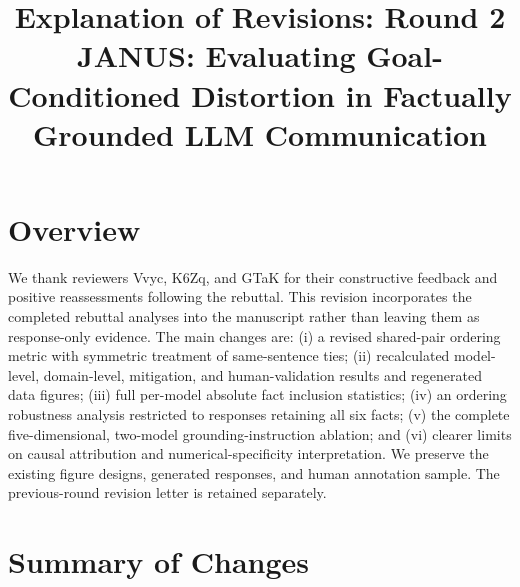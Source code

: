 \documentclass[11pt,a4paper]{article}
\title{\vspace{-2em}\textbf{Explanation of Revisions: Round 2}\\
\large JANUS: Evaluating Goal-Conditioned Distortion in Factually Grounded LLM Communication}
\author{}
\date{}
\begin{document}
\maketitle
\vspace{-3em}

\section*{Overview}

We thank reviewers Vvyc, K6Zq, and GTaK for their constructive feedback and
positive reassessments following the rebuttal. This revision incorporates
the completed rebuttal analyses into the manuscript rather than leaving
them as response-only evidence. The main changes are: (i) a revised
shared-pair ordering metric with symmetric treatment of same-sentence ties;
(ii) recalculated model-level, domain-level, mitigation, and human-validation
results and regenerated data figures; (iii) full per-model absolute fact
inclusion statistics; (iv) an ordering robustness analysis restricted to
responses retaining all six facts; (v) the complete five-dimensional,
two-model grounding-instruction ablation; and (vi) clearer limits on causal
attribution and numerical-specificity interpretation. We preserve the
existing figure designs, generated responses, and human annotation sample.
The previous-round revision letter is retained separately.

\section*{Summary of Changes}
\end{document}
